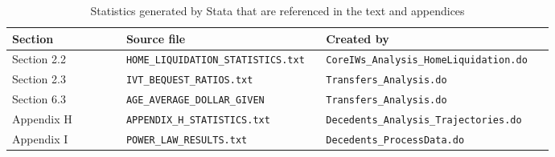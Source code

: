 \documentclass[a4,12p]{article}
\begin{document}
\begin{landscape}
\begin{table}[ht]
\caption{Statistics generated by Stata that are referenced in the text and appendices \label{Tab:Statistics}}
\begin{tabular}{p{0.20\linewidth} p{0.35\linewidth} p{0.40\linewidth}}
\toprule
Section & Source file & Created by \\
\midrule
Section 2.2 & {\tt HOME\_LIQUIDATION\_STATISTICS.txt} &  {\tt CoreIWs\_Analysis\_HomeLiquidation.do} \\
\midrule
Section 2.3  & {\tt IVT\_BEQUEST\_RATIOS.txt} & {\tt Transfers\_Analysis.do} \\
\midrule
Section 6.3 & {\tt AGE\_AVERAGE\_DOLLAR\_GIVEN} & {\tt Transfers\_Analysis.do} \\
\midrule
Appendix H & {\tt APPENDIX\_H\_STATISTICS.txt} & {\tt Decedents\_Analysis\_Trajectories.do} \\
\midrule
Appendix I & {\tt POWER\_LAW\_RESULTS.txt} & {\tt Decedents\_ProcessData.do} \\
\bottomrule
\end{tabular}
\end{table}
\end{landscape}
\end{document}
